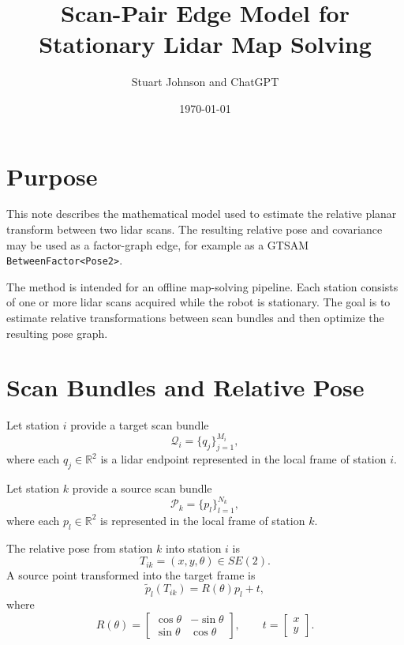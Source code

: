 \documentclass[11pt]{article}
\title{Scan-Pair Edge Model for Stationary Lidar Map Solving}
\author{Stuart Johnson and ChatGPT}
\date{\today}
\begin{document}
\maketitle

\section{Purpose}

This note describes the mathematical model used to estimate the relative planar transform between two lidar scans. The resulting relative pose and covariance may be used as a factor-graph edge, for example as a GTSAM \texttt{BetweenFactor<Pose2>}.

The method is intended for an offline map-solving pipeline. Each station consists of one or more lidar scans acquired while the robot is stationary. The goal is to estimate relative transformations between scan bundles and then optimize the resulting pose graph.

\section{Scan Bundles and Relative Pose}

Let station $i$ provide a target scan bundle
\begin{equation}
\mathcal{Q}_i = \{q_j\}_{j=1}^{M_i},
\end{equation}
where each $q_j \in \mathbb{R}^2$ is a lidar endpoint represented in the local frame of station $i$.

Let station $k$ provide a source scan bundle
\begin{equation}
\mathcal{P}_k = \{p_l\}_{l=1}^{N_k},
\end{equation}
where each $p_l \in \mathbb{R}^2$ is represented in the local frame of station $k$.

The relative pose from station $k$ into station $i$ is
\begin{equation}
T_{ik} = (x,y,\theta) \in SE(2).
\end{equation}
A source point transformed into the target frame is
\begin{equation}
\tilde p_l(T_{ik}) = R(\theta)p_l + t,
\end{equation}
where
\begin{equation}
R(\theta) =
\begin{bmatrix}
\cos\theta & -\sin\theta \\
\sin\theta & \cos\theta
\end{bmatrix},
\qquad
 t = \begin{bmatrix}x \\ y\end{bmatrix}.
\end{equation}
\end{document}
